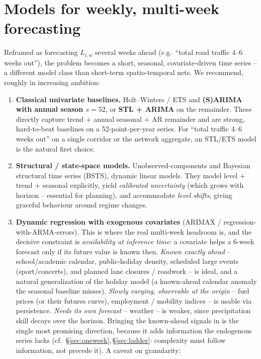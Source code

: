 \documentclass[11pt]{article}
\begin{document}
\section{Models for weekly, multi-week forecasting}
\label{sec:models}
Reframed as forecasting $L_{i,w}$ several weeks ahead (e.g.\ ``total road traffic
4--6 weeks out''), the problem becomes a short, seasonal, covariate-driven time
series -- a different model class than short-term spatio-temporal nets. We
recommend, roughly in increasing ambition:

\begin{enumerate}
\item \textbf{Classical univariate baselines.} Holt--Winters / ETS and
  \textbf{(S)ARIMA with annual season $s{=}52$}, or \textbf{STL + ARIMA} on the
  remainder. These directly capture trend $+$ annual seasonal $+$ AR remainder and
  are strong, hard-to-beat baselines on a 52-point-per-year series. For
  ``total traffic 4--6 weeks out'' on a single corridor or the network aggregate,
  an STL/ETS model is the natural first choice.
\item \textbf{Structural / state-space models.} Unobserved-components and Bayesian
  structural time series (BSTS), dynamic linear models. They model
  level $+$ trend $+$ seasonal explicitly, yield \emph{calibrated uncertainty}
  (which grows with horizon -- essential for planning), and accommodate
  \emph{level shifts}, giving graceful behaviour around regime changes.
\item \textbf{Dynamic regression with exogenous covariates} (ARIMAX /
  regression-with-ARMA-errors). This is where the real multi-week headroom is, and
  the decisive constraint is \emph{availability at inference time}: a covariate
  helps a $6$-week forecast only if its future value is known then. \emph{Known
  exactly ahead} -- school/academic calendar, public-holiday density, scheduled
  large events (sport/concerts), and planned lane closures / roadwork -- is ideal,
  and a natural generalization of the holiday model (a known-ahead calendar anomaly
  the seasonal baseline misses). \emph{Slowly varying, observable at the origin} --
  fuel prices (or their futures curve), employment / mobility indices -- is usable
  via persistence. \emph{Needs its own forecast} -- weather -- is weaker, since
  precipitation skill decays over the horizon. Bringing the known-ahead signals in
  is the single most promising direction, because it adds information the
  endogenous series lacks (cf.\ \S\ref{sec:oneweek},\,\S\ref{sec:ladder}:
  complexity must follow information, not precede it). A caveat on granularity:

\end{enumerate}
\end{document}
